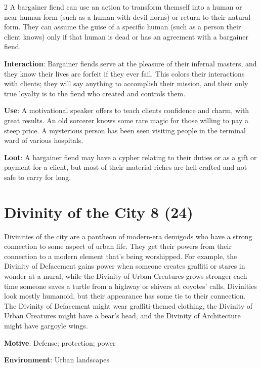 \begin{multicols}{2}
A bargainer fiend can use an action to transform themself into a human or near-human form (such as a human with devil horns) or return to their natural form. They can assume the guise of a specific human (such as a person their client knows) only if that human is dead or has an agreement with a bargainer fiend. 

\textbf{Interaction}: Bargainer fiends serve at the pleasure of their infernal masters, and they know their lives are forfeit if they ever fail. This colors their interactions with clients; they will say anything to accomplish their mission, and their only true loyalty is to the fiend who created and controls them. 

\textbf{Use}: A motivational speaker offers to teach clients confidence and charm, with great results. An old sorcerer knows some rare magic for those willing to pay a steep price. A mysterious person has been seen visiting people in the terminal ward of various hospitals. 

\textbf{Loot}: A bargainer fiend may have a cypher relating to their duties or as a gift or payment for a client, but most of their material riches are hell-crafted and not safe to carry for long.

\section{Divinity of the City 8 (24)}

Divinities of the city are a pantheon of modern-era demigods who have a strong connection to some aspect of urban life. They get their powers from their connection to a modern element that’s being worshipped. For example, the Divinity of Defacement gains power when someone creates graffiti or stares in wonder at a mural, while the Divinity of Urban Creatures grows stronger each time someone saves a turtle from a highway or shivers at coyotes’ calls. Divinities look mostly humanoid, but their appearance has some tie to their connection. The Divinity of Defacement might wear graffiti-themed clothing, the Divinity of Urban Creatures might have a bear’s head, and the Divinity of Architecture might have gargoyle wings.

\textbf{Motive}: Defense; protection; power 

\textbf{Environment}: Urban landscapes 


\end{multicols}
